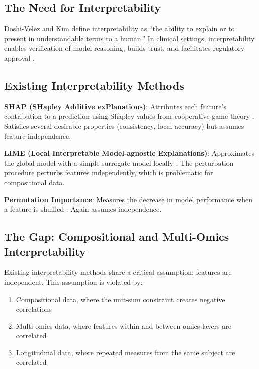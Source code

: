 \documentclass[12pt,a4paper]{report}
\begin{document}
\subsection{The Need for Interpretability}

Doshi-Velez and Kim \cite{doshi2017towards} define interpretability as ``the ability to explain or to present in understandable terms to a human.'' In clinical settings, interpretability enables verification of model reasoning, builds trust, and facilitates regulatory approval \cite{lewis2020does}.

\subsection{Existing Interpretability Methods}

\textbf{SHAP (SHapley Additive exPlanations)}: Attributes each feature's contribution to a prediction using Shapley values from cooperative game theory \cite{lundberg2017unified, lundberg2020local}. Satisfies several desirable properties (consistency, local accuracy) but assumes feature independence.

\textbf{LIME (Local Interpretable Model-agnostic Explanations)}: Approximates the global model with a simple surrogate model locally \cite{ribeiro2016why}. The perturbation procedure perturbs features independently, which is problematic for compositional data.

\textbf{Permutation Importance}: Measures the decrease in model performance when a feature is shuffled \cite{breiman2001, altmann2010}. Again assumes independence.

\subsection{The Gap: Compositional and Multi-Omics Interpretability}

Existing interpretability methods share a critical assumption: features are independent. This assumption is violated by:
\begin{enumerate}
    \item Compositional data, where the unit-sum constraint creates negative correlations
    \item Multi-omics data, where features within and between omics layers are correlated
    \item Longitudinal data, where repeated measures from the same subject are correlated
\end{enumerate}
\end{document}

